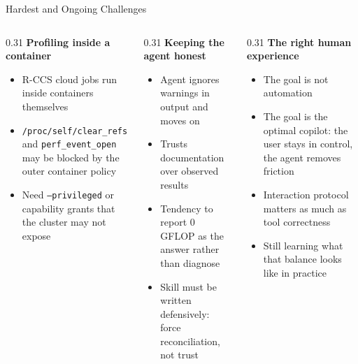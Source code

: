 \documentclass[aspectratio=169]{beamer}
\begin{document}
\begin{frame}{Hardest and Ongoing Challenges}
  \begin{columns}[T,totalwidth=\textwidth]
    \begin{column}{0.31\textwidth}
      \textbf{Profiling inside a container}
      \begin{itemize}
        \item R-CCS cloud jobs run inside containers themselves
        \item \texttt{/proc/self/clear\_refs} and \texttt{perf\_event\_open}
              may be blocked by the outer container policy
        \item Need \texttt{--privileged} or capability grants that the
              cluster may not expose
      \end{itemize}
    \end{column}
    \begin{column}{0.31\textwidth}
      \textbf{Keeping the agent honest}
      \begin{itemize}
        \item Agent ignores warnings in output and moves on
        \item Trusts documentation over observed results
        \item Tendency to report 0 GFLOP as the answer rather than diagnose
        \item Skill must be written defensively: force reconciliation,
              not trust
      \end{itemize}
    \end{column}
    \begin{column}{0.31\textwidth}
      \textbf{The right human experience}
      \begin{itemize}
        \item The goal is not automation
        \item The goal is the optimal copilot: the user stays in control,
              the agent removes friction
        \item Interaction protocol matters as much as tool correctness
        \item Still learning what that balance looks like in practice
      \end{itemize}
    \end{column}
  \end{columns}
\end{frame}
\end{document}
